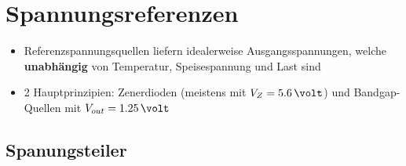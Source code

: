 \section{Spannungsreferenzen}

\begin{itemize}
    \item Referenzspannungsquellen liefern idealerweise Ausgangsspannungen, welche \textbf{unabhängig} von 
        Temperatur, Speisespannung und Last sind
    \item 2 Hauptprinzipien: Zenerdioden (meistens mit $V_Z = 5.6 \,\volt$) und Bandgap-Quellen mit $V_{out} = 1.25 \, \volt$
\end{itemize}


\subsection{Spanungsteiler}

